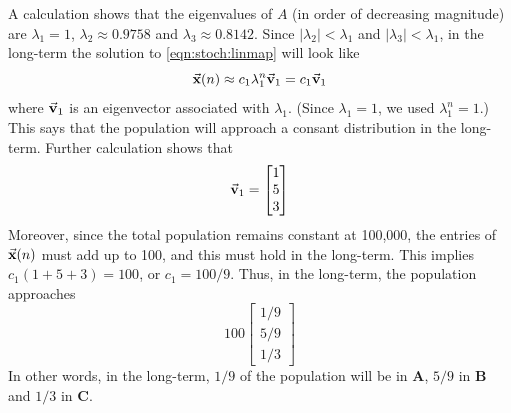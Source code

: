 A calculation shows that the eigenvalues of $A$
(in order of decreasing magnitude) are
$\lambda_1 = 1$, $\lambda_2 \approx 0.9758$ and $\lambda_3 \approx 0.8142$.
Since $|\lambda_2| < \lambda_1$ and $|\lambda_3| < \lambda_1$, in the
long-term the solution to \eqref{eqn:stoch:linmap}
will look like
\begin{equation}
   \vec{\textbf{x}}(n) \approx c_1 \lambda_1^n\vec{\textbf{v}}_1 = c_1 \vec{\textbf{v}}_1 
\end{equation}
where $\vec{\textbf{v}}_1$ is an eigenvector associated with $\lambda_1$.
(Since $\lambda_1=1$, we used $\lambda_1^n=1$.)  This says that the
population will approach a consant distribution in the long-term.
Further calculation shows that
\begin{equation}
  \vec{\textbf{v}}_1 = \begin{bmatrix}
               1 \\ 5 \\ 3
          \end{bmatrix}
\end{equation}
Moreover, since the total population remains constant at 100,000,
the entries of $\vec{\textbf{x}}(n)$ must add up to 100, and this must hold in
the long-term.  This implies $c_1(1+5+3) = 100$, or
$c_1 = 100/9$.  Thus, in the long-term, the population approaches
\begin{equation}
    100\begin{bmatrix} 1/9 \\ 5/9 \\ 1/3\end{bmatrix}
\end{equation}
In other words, in the long-term, $1/9$ of the population will
be in \textbf{A}, $5/9$ in \textbf{B} and $1/3$ in \textbf{C}.


